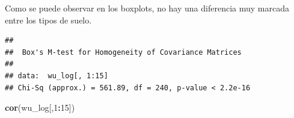 \documentclass[
]{article}
\newenvironment{Shaded}{\begin{snugshade}}{\end{snugshade}}
\newcommand{\DecValTok}[1]{\textcolor[rgb]{0.00,0.00,0.81}{#1}}
\newcommand{\FunctionTok}[1]{\textcolor[rgb]{0.13,0.29,0.53}{\textbf{#1}}}
\newcommand{\NormalTok}[1]{#1}
\newcommand{\OtherTok}[1]{\textcolor[rgb]{0.56,0.35,0.01}{#1}}
\newcommand{\SpecialCharTok}[1]{\textcolor[rgb]{0.81,0.36,0.00}{\textbf{#1}}}
\begin{document}
Como se puede observar en los boxplots, no hay una diferencia muy
marcada entre los tipos de suelo.

\begin{Shaded}
\end{Shaded}

\begin{verbatim}
## 
##  Box's M-test for Homogeneity of Covariance Matrices
## 
## data:  wu_log[, 1:15]
## Chi-Sq (approx.) = 561.89, df = 240, p-value < 2.2e-16
\end{verbatim}

\begin{Shaded}
\begin{Highlighting}[]
\FunctionTok{cor}\NormalTok{(wu\_log[,}\DecValTok{1}\SpecialCharTok{:}\DecValTok{15}\NormalTok{])}
\end{Highlighting}
\end{Shaded}
\end{document}
